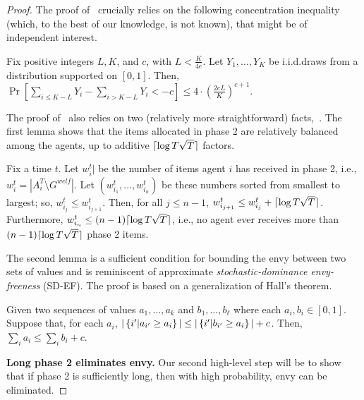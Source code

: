 \begin{proof}
    The proof of~ crucially relies on the following concentration inequality (which, to the best of our knowledge, is not known), that might be of independent interest.

    \begin{lemma}\label{lem:concentration}
    Fix positive integers $L, K$, and $c$, with $L < \frac{K}{4e}$. Let $Y_1, \ldots, Y_K$ be i.i.d.\@ draws from a distribution supported on $[0, 1]$. Then, $\Pr\left[\sum_{i \le K - L} Y_i - \sum_{i > K - L} Y_i < -c \right] \leq 4 \cdot \left(\frac{2 e L}{K} \right)^{c + 1}$.
    \end{lemma}

    The proof of~  also relies on two (relatively more straightforward) facts,~. 
    The first lemma shows that the items allocated in phase 2 are relatively balanced among the agents, up to additive $\lceil\log T \sqrt{T}\rceil$ factors.
    
    
    \begin{lemma}\label{lem:phase-2-items}
        Fix a time $t$. Let $w^t_i|$ be the number of items agent $i$ has received in phase 2, i.e., $w^t_i = |A^T_i \setminus G^{welf}|$. Let $(w^t_{i_1}, \ldots, w^t_{i_n})$ be these numbers sorted from smallest to largest; so, $w^t_{i_j} \le w^t_{i_{j + 1}}$. Then, for all $j \le n - 1$, $w^t_{i_{j + 1}} \le w^t_{i_j} + \lceil\log T \sqrt{T}\rceil$. Furthermore, $w^t_{i_n} \le (n - 1) \lceil\log T \sqrt{T}\rceil$, i.e., no agent ever receives more than $(n - 1) \lceil\log T \sqrt{T}\rceil$ phase 2 items. 
    \end{lemma}
    The second lemma is a sufficient condition for bounding the envy between two sets of values and is reminiscent of approximate \emph{stochastic-dominance envy-freeness} (SD-EF). The proof is based on a generalization of Hall's theorem.
    \begin{lemma}\label{lem:halls}
        Given two sequences of values $a_1, \ldots, a_k$ and $b_1, \ldots, b_{\ell}$ where each $a_i, b_i \in [0, 1]$. Suppose that, for each $a_i$, $|\left\{i' | a_{i'} \ge a_i\right\}| \le |\left\{i' | b_{i'} \ge a_i\right\}| + c$. Then, $\sum_i a_i \le \sum_i b_i + c$. 
    \end{lemma}

    \textbf{Long phase 2 eliminates envy.} Our second high-level step will be to show that if phase 2 is sufficiently long, then with high probability, envy can be eliminated.


\end{proof}
